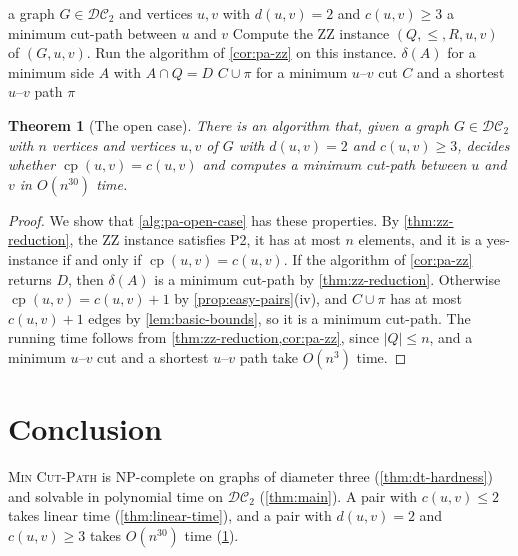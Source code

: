 \documentclass[pdflatex,sn-mathphys-num]{sn-jnl}%
\theoremstyle{thmstyleone}%
\newtheorem{theorem}{Theorem}%
\theoremstyle{thmstyletwo}%
\theoremstyle{thmstylethree}%
\newcommand{\cp}{\operatorname{cp}}%
\newcommand{\DC}{\mathcal{DC}_2}%
\newcommand{\MinCutPath}{\textsc{Min Cut-Path}}%
\begin{document}
\begin{algorithm}[tb]
\caption{A minimum cut-path for an instance $(G, u, v)$ of the open case}
\label{alg:pa-open-case}
\begin{algorithmic}[1]
\Require a graph $G \in \DC$ and vertices $u, v$ with $d(u, v) = 2$ and $c(u, v) \geq 3$
\Ensure a minimum cut-path between $u$ and $v$
\State Compute the ZZ instance $(Q, \leq, R, u, v)$ of $(G, u, v)$.
\State Run the algorithm of \cref{cor:pa-zz} on this instance.
\State \Return $\delta(A)$ for a minimum side $A$ with $A \cap Q = D$
\Else
\State \Return $C \cup \pi$ for a minimum $u$--$v$ cut $C$ and a shortest $u$--$v$ path $\pi$
\EndIf
\end{algorithmic}
\end{algorithm}

\begin{theorem}[The open case]
\label{thm:pa-open-case}
There is an algorithm that, given a graph $G \in \DC$ with $n$ vertices and vertices $u, v$ of $G$ with $d(u, v) = 2$ and $c(u, v) \geq 3$, decides whether $\cp(u, v) = c(u, v)$ and computes a minimum cut-path between $u$ and $v$ in $O(n^{30})$ time.
\end{theorem}

\begin{proof}
We show that \cref{alg:pa-open-case} has these properties.
By \cref{thm:zz-reduction}, the ZZ instance satisfies P2, it has at most $n$ elements, and it is a yes-instance if and only if $\cp(u, v) = c(u, v)$.
If the algorithm of \cref{cor:pa-zz} returns $D$, then $\delta(A)$ is a minimum cut-path by \cref{thm:zz-reduction}.
Otherwise $\cp(u, v) = c(u, v) + 1$ by \cref{prop:easy-pairs}(iv), and $C \cup \pi$ has at most $c(u, v) + 1$ edges by \cref{lem:basic-bounds}, so it is a minimum cut-path.
The running time follows from \cref{thm:zz-reduction,cor:pa-zz}, since $|Q| \leq n$, and a minimum $u$--$v$ cut and a shortest $u$--$v$ path take $O(n^3)$ time.
\end{proof}

\section{Conclusion}\label{sec:conclusion}

\MinCutPath{} is NP-complete on graphs of diameter three (\cref{thm:dt-hardness}) and solvable in polynomial time on $\DC$ (\cref{thm:main}).
A pair with $c(u, v) \leq 2$ takes linear time (\cref{thm:linear-time}), and a pair with $d(u, v) = 2$ and $c(u, v) \geq 3$ takes $O(n^{30})$ time (\cref{thm:pa-open-case}).
\end{document}
